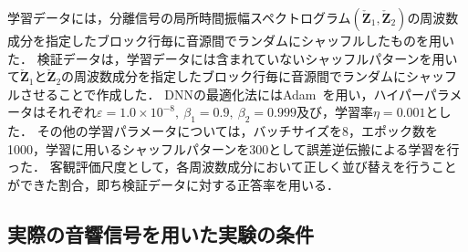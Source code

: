 
学習データには，分離信号の局所時間振幅スペクトログラム$(\check{\bm{Z}}_1, \check{\bm{Z}}_2)$の周波数成分を指定したブロック行毎に音源間でランダムにシャッフルしたものを用いた．
検証データは，学習データには含まれていないシャッフルパターンを用いて$\check{\bm{Z}}_1$と$\check{\bm{Z}}_2$の周波数成分を指定したブロック行毎に音源間でランダムにシャッフルさせることで作成した．
DNNの最適化法にはAdam~\cite{adam}を用い，ハイパーパラメータはそれぞれ$\varepsilon=1.0\times10^{-8},~\beta_1 = 0.9,~\beta_2 = 0.999$及び，学習率$\eta=0.001$とした．
その他の学習パラメータについては，バッチサイズを8，エポック数を1000，学習に用いるシャッフルパターンを300として誤差逆伝搬による学習を行った．
客観評価尺度として，各周波数成分において正しく並び替えを行うことができた割合，即ち検証データに対する正答率を用いる．

\subsection{実際の音響信号を用いた実験の条件}
\label{sec:ex_condition_audio}


